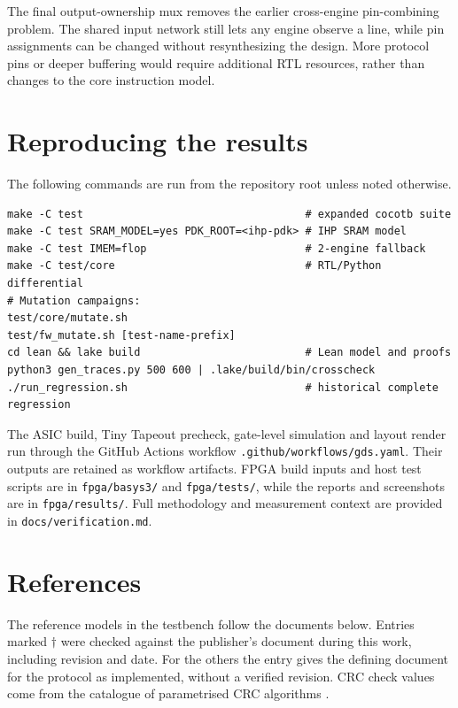 \documentclass[11pt]{article}
\begin{document}
The final output-ownership mux removes the earlier cross-engine pin-combining problem. The shared input network still lets any engine observe a line, while pin assignments can be changed without resynthesizing the design. More protocol pins or deeper buffering would require additional RTL resources, rather than changes to the core instruction model.

\section{Reproducing the results}

The following commands are run from the repository root unless noted otherwise.
\begin{lstlisting}[language={}]
make -C test                                   # expanded cocotb suite
make -C test SRAM_MODEL=yes PDK_ROOT=<ihp-pdk> # IHP SRAM model
make -C test IMEM=flop                         # 2-engine fallback
make -C test/core                              # RTL/Python differential
# Mutation campaigns:
test/core/mutate.sh
test/fw_mutate.sh [test-name-prefix]
cd lean && lake build                          # Lean model and proofs
python3 gen_traces.py 500 600 | .lake/build/bin/crosscheck
./run_regression.sh                            # historical complete regression
\end{lstlisting}

The ASIC build, Tiny Tapeout precheck, gate-level simulation and layout render run through the GitHub Actions workflow \texttt{.github/workflows/gds.yaml}. Their outputs are retained as workflow artifacts. FPGA build inputs and host test scripts are in \texttt{fpga/basys3/} and \texttt{fpga/tests/}, while the reports and screenshots are in \texttt{fpga/results/}. Full methodology and measurement context are provided in \texttt{docs/verification.md}.

\section*{References}
\small
The reference models in the testbench follow the documents below.
Entries marked $\dagger$ were checked against the publisher's document during this work, including revision and date.
For the others the entry gives the defining document for the protocol as implemented, without a verified revision.
CRC check values come from the catalogue of parametrised CRC algorithms \cite{reveng}.
\end{document}
